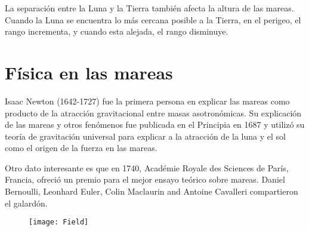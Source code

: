 \documentclass[12pt]{article}
\begin{document}
La separación entre la Luna y la Tierra también afecta la altura de las mareas.  Cuando la Luna se
encuentra lo más cercana posible a la Tierra, en el perigeo, el rango incrementa, y cuando esta alejada, el rango disminuye. 


 
 

\section{Física en las mareas}
Isaac Newton (1642-1727) fue la primera persona en explicar las mareas como producto de la atracción gravitacional entre masas asotronómicas. Su explicación de las mareas y otros fenómenos fue publicada en el Principia en 1687 y utilizó su teoría de gravitación universal para explicar a la atracción de la luna y el sol como el origen de la fuerza en las mareas. 

Otro dato interesante es que en 1740, Académie Royale des Sciences de París, Francia, ofreció un premio para el mejor ensayo teórico sobre mareas. Daniel Bernoulli, Leonhard Euler, Colin Maclaurin and Antoine Cavalleri compartieron el galardón.

\begin{figure}[h]
\centering
\texttt{[image: Field]}
\end{figure}
\end{document}

